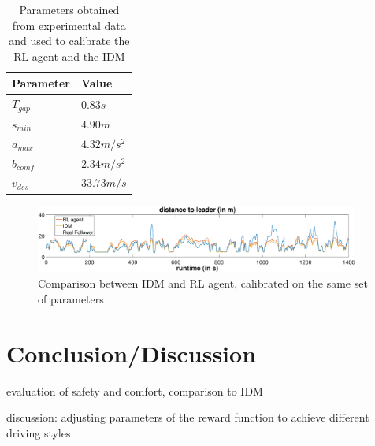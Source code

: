 \documentclass[review]{elsarticle}
\begin{document}
\begin{table}
	\caption{Parameters obtained from experimental data and used to calibrate the RL agent and the IDM} 
	\label{tab:IDMparameters} 
	\begin{center}
		\begin{tabular}{ p{} |p{}  } 
		Parameter & Value   \\ \hline
			$T_{gap}$ & $0.83s$\\
			$s_{min}$ & $4.90m$\\
			$a_{max}$ & $4.32m/s^2$\\
			$b_{comf}$ & $2.34 m/s^2$\\
			$v_{des}$ & $33.73m/s$
			
		\end{tabular}
	\end{center}
\end{table}


\begin{figure}
	\centering
	\includegraphics[width=0.95\textwidth]{images/IDMvsRL_dist}
	\caption{Comparison between IDM and RL agent, calibrated on the same set of parameters}
	\label{fig:IDMvsRL}
\end{figure}



\section{Conclusion/Discussion}
evaluation of safety and comfort, comparison to IDM

discussion: adjusting parameters of the reward function to achieve different driving styles




\end{document}

